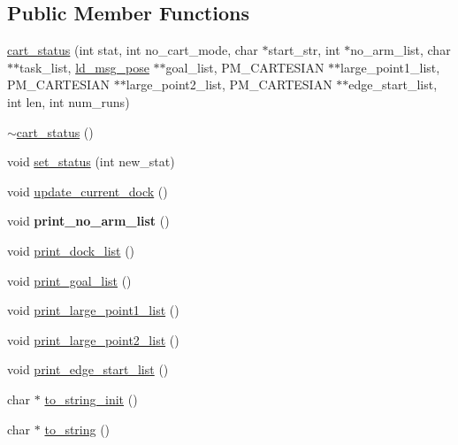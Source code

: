 \subsection*{Public Member Functions}
\begin{DoxyCompactItemize}
\item 
\mbox{\hyperlink{classcart__status_ac9302583f7f24fbc6c205a81416ff397}{cart\+\_\+status}} (int stat, int no\+\_\+cart\+\_\+mode, char $\ast$start\+\_\+str, int $\ast$no\+\_\+arm\+\_\+list, char $\ast$$\ast$task\+\_\+list, \mbox{\hyperlink{structld__msg__pose}{ld\+\_\+msg\+\_\+pose}} $\ast$$\ast$goal\+\_\+list, P\+M\+\_\+\+C\+A\+R\+T\+E\+S\+I\+AN $\ast$$\ast$large\+\_\+point1\+\_\+list, P\+M\+\_\+\+C\+A\+R\+T\+E\+S\+I\+AN $\ast$$\ast$large\+\_\+point2\+\_\+list, P\+M\+\_\+\+C\+A\+R\+T\+E\+S\+I\+AN $\ast$$\ast$edge\+\_\+start\+\_\+list, int len, int num\+\_\+runs)
\item 
\mbox{\hyperlink{classcart__status_a36ae36b8682afa50ecaa568285b1b32c}{$\sim$cart\+\_\+status}} ()
\item 
void \mbox{\hyperlink{classcart__status_a5db1241aff0bd874c8d108666ec8b323}{set\+\_\+status}} (int new\+\_\+stat)
\item 
void \mbox{\hyperlink{classcart__status_a25c8b8f4c2d8b516284f9cb463f007a8}{update\+\_\+current\+\_\+dock}} ()
\item 
\mbox{\label{classcart__status_adec6fe0924beb76adcc53ad15b9a2034}} 
void {\bfseries print\+\_\+no\+\_\+arm\+\_\+list} ()
\item 
void \mbox{\hyperlink{classcart__status_ae58ecd2c7d79aa9d35eec0bbfd1c7a32}{print\+\_\+dock\+\_\+list}} ()
\item 
void \mbox{\hyperlink{classcart__status_a07d3f2bf7b4e430645ae22ffb46143cb}{print\+\_\+goal\+\_\+list}} ()
\item 
void \mbox{\hyperlink{classcart__status_a9decf11bef6e36c350463102401c247e}{print\+\_\+large\+\_\+point1\+\_\+list}} ()
\item 
void \mbox{\hyperlink{classcart__status_a8a6a9273616bef95c4d0aeccb2524aaa}{print\+\_\+large\+\_\+point2\+\_\+list}} ()
\item 
void \mbox{\hyperlink{classcart__status_a52ef441e0a19a051270909656efbc30e}{print\+\_\+edge\+\_\+start\+\_\+list}} ()
\item 
char $\ast$ \mbox{\hyperlink{classcart__status_ae7c18dab45a356066eb36b81b985194f}{to\+\_\+string\+\_\+init}} ()
\item 
char $\ast$ \mbox{\hyperlink{classcart__status_a555321d8af00245d5d53ec52876e54e7}{to\+\_\+string}} ()
$$
\end{DoxyCompactItemize}
